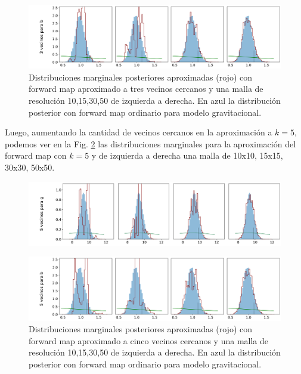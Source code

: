 \begin{figure}[H] 
    \centering 
    \includegraphics[width = 16 cm ]{img/Exp_Central_gravedad_Sigma/Figuras/Generales/Convergencia_theta2_1_gravedad_sigma.png} 
    \caption{Distribuciones marginales posteriores aproximadas (rojo) con forward map aproximado a tres vecinos cercanos y una malla de resolución 10,15,30,50 de izquierda a derecha. En azul la distribución posterior con forward map ordinario para modelo gravitacional.}
    \label{Fig. Aprox grav 3v}
\end{figure} 

Luego, aumentando la cantidad de vecinos cercanos en la aproximación a $k = 5$, podemos ver en la Fig. \ref{Fig. Aprox grav 5v} las distribuciones marginales para la aproximación del forward map con $k = 5$ y de izquierda a derecha una malla de 10x10, 15x15, 30x30, 50x50.

\begin{figure}[H] 
    \centering 
    \includegraphics[width = 16 cm ]{img/Exp_Central_gravedad_Sigma/Figuras/Generales/Convergencia_theta1_2_gravedad_sigma.png} 
\end{figure} 
\begin{figure}[H] 
    \centering 
    \includegraphics[width = 16 cm ]{img/Exp_Central_gravedad_Sigma/Figuras/Generales/Convergencia_theta2_2_gravedad_sigma.png} 
    \caption{Distribuciones marginales posteriores aproximadas (rojo) con forward map aproximado a cinco vecinos cercanos y una malla de resolución 10,15,30,50 de izquierda a derecha. En azul la distribución posterior con forward map ordinario para modelo gravitacional.}
    \label{Fig. Aprox grav 5v}
\end{figure} 

